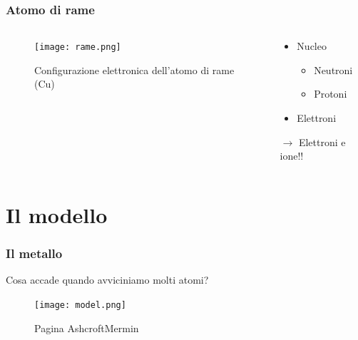 	\begin{frame}[c]\frametitle{Atomo di rame}
	    \begin{columns}
			\begin{column}{0.5\textwidth}
			\begin{figure}[tb]
				\centering
				\texttt{[image: rame.png]}
				\caption{Configurazione elettronica dell'atomo di rame (Cu)}
				\label{fig:atomo_di_rame}
			\end{figure}
			\end{column}
			\begin{column}{0.4\textwidth}
				\begin{itemize}
					\item Nucleo
					\begin{itemize}
						\item Neutroni
						\item Protoni
					\end{itemize}
					\item Elettroni
				\end{itemize}

				\vspace{0.5cm}
				
				$\longrightarrow$ Elettroni e ione!!

			\end{column}
		\end{columns}
	
	\end{frame}


	\section{Il modello} %
	\label{sec:il_modello}
		\begin{frame}[c]\frametitle{Il metallo}
		    
		Cosa accade quando avviciniamo molti atomi?

		\begin{figure}[tb]
			\centering
			\texttt{[image: model.png]}
			\caption{Pagina Ashcroft\/Mermin}
			\label{fig:figure1}
		\end{figure}
				
		\end{frame}
		
